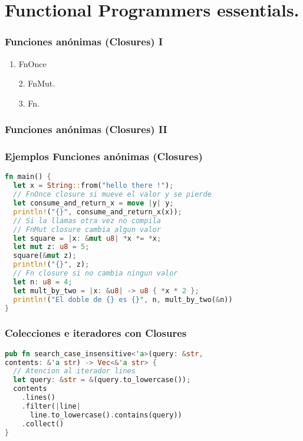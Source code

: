 \documentclass{beamer}
\begin{document}
\section{Functional Programmers essentials.}
\begin{frame}
  \frametitle{Funciones anónimas (Closures) I}
  \begin{enumerate}[1.]
    \item FnOnce
    \pause
    \item    [2.] FnMut.
    \pause
    \item    [3.] Fn.
  \end{enumerate}
\end{frame}

\begin{frame}
  \frametitle{Funciones anónimas (Closures) II}
    \center 
\end{frame}
\begin{frame}[fragile]
  \frametitle{Ejemplos Funciones anónimas (Closures) }
  \begin{lstlisting}[language=Rust, style=boxed ]
fn main() {
  let x = String::from("hello there !");
  // FnOnce closure si mueve el valor y se pierde
  let consume_and_return_x = move |y| y;
  println!("{}", consume_and_return_x(x));
  // Si la llamas otra vez no compila
  // FnMut closure cambia algun valor
  let square = |x: &mut u8| *x *= *x;
  let mut z: u8 = 5;
  square(&mut z);
  println!("{}", z);
  // Fn closure si no cambia ningun valor
  let n: u8 = 4;
  let mult_by_two = |x: &u8| -> u8 { *x * 2 };
  println!("El doble de {} es {}", n, mult_by_two(&n))
}\end{lstlisting}
\end{frame}

\begin{frame}[fragile]
  \frametitle{Colecciones e iteradores con Closures}
  \begin{lstlisting}[language=Rust, style=boxed ]
pub fn search_case_insensitive<'a>(query: &str, 
contents: &'a str) -> Vec<&'a str> {
  // Atencion al iterador lines
  let query: &str = &(query.to_lowercase());
  contents
    .lines()
    .filter(|line| 
      line.to_lowercase().contains(query))
    .collect()
}\end{lstlisting}
\end{frame}

\end{document}
